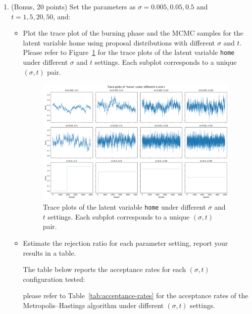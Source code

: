 \documentclass{article}
\begin{document}
\begin{enumerate}
\item (Bonus, 20 points) Set the parameters as $\sigma = 0.005, 0.05, 0.5$ and $t = 1, 5, 20, 50$, and:
\begin{itemize}
\item Plot the trace plot of the burning phase and the MCMC samples for the latent variable home using
proposal distributions with different $\sigma$ and $t$. \\ Please refer to Figure~\ref{fig:bonus-trace-grid} for the trace plots of the latent variable \texttt{home} under different $\sigma$ and $t$ settings. Each subplot corresponds to a unique $(\sigma, t)$ pair.
\begin{figure}[H]
    \centering
    \includegraphics[width=\textwidth]{bonus_trace_grid.png}
    \caption{Trace plots of the latent variable \texttt{home} under different $\sigma$ and $t$ settings. Each subplot corresponds to a unique $(\sigma, t)$ pair.}
    \label{fig:bonus-trace-grid}
\end{figure}

\item Estimate the rejection ratio for each parameter setting, report your results in a table.


The table below reports the acceptance rates for each $(\sigma, t)$ configuration tested:

please refer to Table~\ref{tab:acceptance-rates} for the acceptance rates of the Metropolis--Hastings algorithm under different $(\sigma, t)$ settings.


\end{itemize}
\end{enumerate}
\end{document}
